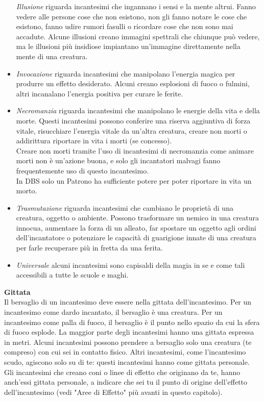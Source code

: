 \begin{multicols}{2}
\begin{itemize}
\textit{Illusione} riguarda incantesimi che ingannano i sensi e la mente altrui. Fanno vedere alle persone cose che non esistono, non gli fanno notare le cose che esistono, fanno udire rumori fasulli o ricordare cose che non sono mai accadute. Alcune illusioni creano immagini spettrali che chiunque può vedere, ma le illusioni più insidiose impiantano un'immagine direttamente nella mente di una creatura.\\
\item
\textit{Invocazione} riguarda incantesimi che manipolano l'energia magica per produrre un effetto desiderato. Alcuni creano esplosioni di fuoco o fulmini, altri incanalano l'energia positiva per curare le ferite.\\
\item
\textit{Necromanzia} riguarda incantesimi che manipolano le energie della vita e della morte. Questi incantesimi possono conferire una riserva aggiuntiva di forza vitale, risucchiare l'energia vitale da un'altra creatura, creare non morti o addirittura riportare in vita i morti (se concesso).\\
Creare non morti tramite l'uso di incantesimi di necromanzia come animare morti non è un'azione buona, e solo gli incantatori malvagi fanno frequentemente uso di questo incantesimo.\\
In DBS solo un Patrono ha sufficiente potere per poter riportare in vita un morto.\\
\item
\textit{Trasmutazione} riguarda incantesimi che cambiano le proprietà di una creatura, oggetto o ambiente. Possono trasformare un nemico in una creatura innocua, aumentare la forza di un alleato, far spostare un oggetto agli ordini dell'incantatore o potenziare le capacità di guarigione innate di una creatura per farle recuperare più in fretta da una ferita.\\
\item
\textit{Universale} alcuni incantesimi sono capisaldi della magia in se e come tali accessibili a tutte le scuole e maghi.

\end{itemize}

\textbf{Gittata}\\
Il bersaglio di un incantesimo deve essere nella gittata dell'incantesimo. Per un incantesimo come dardo incantato, il bersaglio è una creatura. Per un incantesimo come palla di fuoco, il bersaglio è il punto nello spazio da cui la sfera di fuoco esplode. La maggior parte degli incantesimi hanno una gittata espressa in metri. Alcuni incantesimi possono prendere a bersaglio solo una creatura (te compreso) con cui sei in contatto fisico. Altri incantesimi, come l'incantesimo scudo, agiscono solo su di te: questi incantesimi hanno come gittata personale.
\\
Gli incantesimi che creano coni o linee di effetto che originano da te, hanno anch'essi gittata personale, a indicare che sei tu il punto di origine dell'effetto dell'incantesimo (vedi "Aree di Effetto" più avanti in questo capitolo).\\


\end{multicols}
